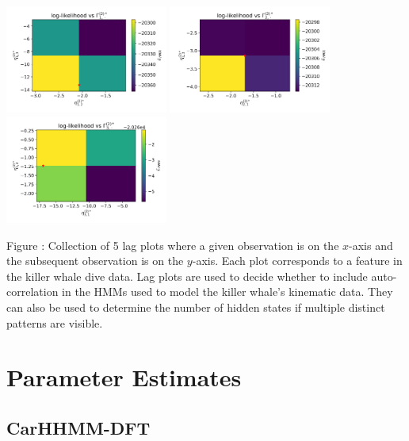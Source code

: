\documentclass{article}
\begin{document}
        \begin{center}
        \includegraphics[width=2.1in]{../Plots/2019/20190902-182840-CATs_OB_1_0_267_CarHHMM2_fine-eta-likelihood-1-row_0.png}
        \includegraphics[width=2.1in]{../Plots/2019/20190902-182840-CATs_OB_1_0_267_CarHHMM2_fine-eta-likelihood-1-row_1.png}
        \includegraphics[width=2.1in]{../Plots/2019/20190902-182840-CATs_OB_1_0_267_CarHHMM2_fine-eta-likelihood-1-row_2.png}
        \end{center}
        
        \noindent Figure : Collection of 5 lag plots where a given observation is on the $x$-axis and the subsequent observation is on the $y$-axis. Each plot corresponds to a feature in the killer whale dive data. Lag plots are used to decide whether to include auto-correlation in the HMMs used to model the killer whale's kinematic data. They can also be used to determine the number of hidden states if multiple distinct patterns are visible. 
        \addtocounter{fignum}{1}
        
        \newpage    
    
    \section{Parameter Estimates}

        \subsection{CarHHMM-DFT}
        
\end{document}
